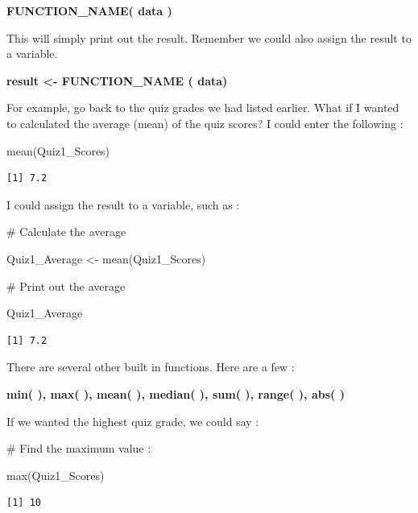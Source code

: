 \documentclass[
  letterpaper,
  DIV=11,
  numbers=noendperiod]{scrreprt}
\newenvironment{Shaded}{\begin{snugshade}}{\end{snugshade}}
\newcommand{\CommentTok}[1]{\textcolor[rgb]{0.37,0.37,0.37}{#1}}
\newcommand{\FunctionTok}[1]{\textcolor[rgb]{0.28,0.35,0.67}{#1}}
\newcommand{\NormalTok}[1]{\textcolor[rgb]{0.00,0.23,0.31}{#1}}
\newcommand{\OtherTok}[1]{\textcolor[rgb]{0.00,0.23,0.31}{#1}}
\begin{document}
\textbf{FUNCTION\_NAME( data )}

This will simply print out the result. Remember we could also assign the
result to a variable.

\textbf{result \textless- FUNCTION\_NAME ( data)}

For example, go back to the quiz grades we had listed earlier. What if I
wanted to calculated the average (mean) of the quiz scores? I could
enter the following :

\begin{Shaded}
\begin{Highlighting}[]
\FunctionTok{mean}\NormalTok{(Quiz1\_Scores)}
\end{Highlighting}
\end{Shaded}

\begin{verbatim}
[1] 7.2
\end{verbatim}

I could assign the result to a variable, such as :

\begin{Shaded}
\begin{Highlighting}[]
\CommentTok{\# Calculate the average}

\NormalTok{Quiz1\_Average }\OtherTok{\textless{}{-}} \FunctionTok{mean}\NormalTok{(Quiz1\_Scores)}

\CommentTok{\# Print out the average}

\NormalTok{Quiz1\_Average}
\end{Highlighting}
\end{Shaded}

\begin{verbatim}
[1] 7.2
\end{verbatim}

There are several other built in functions. Here are a few :

\textbf{min( ), max( ), mean( ), median( ), sum( ), range( ), abs( )}

If we wanted the highest quiz grade, we could say :

\begin{Shaded}
\begin{Highlighting}[]
\CommentTok{\# Find the maximum value :}

\FunctionTok{max}\NormalTok{(Quiz1\_Scores)}
\end{Highlighting}
\end{Shaded}

\begin{verbatim}
[1] 10
\end{verbatim}
\end{document}
